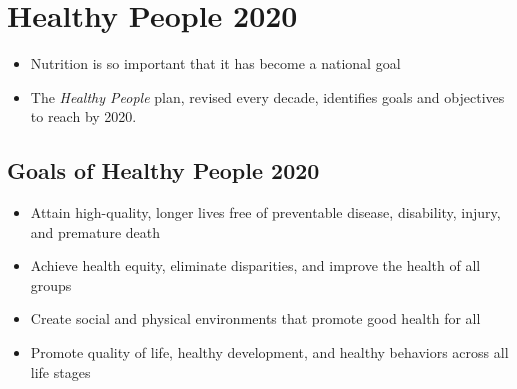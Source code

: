 \documentclass[title={Chapter 1}]{fdsn201notes}
\begin{document}
\section{Healthy People 2020}\label{sec:healthy-people-2020}
\begin{itemize}
	\item Nutrition is so important that it has become a national goal
	\item The \emph{Healthy People} plan, revised every decade, identifies goals and objectives to reach by 2020.
\end{itemize}

\subsection{Goals of Healthy People 2020}\label{subsec:goals-of-healthy-people-2020}
\begin{itemize}
	\item Attain high-quality, longer lives free of preventable disease, disability, injury, and premature death
	\item Achieve health equity, eliminate disparities, and improve the health of all groups
	\item Create social and physical environments that promote good health for all
	\item Promote quality of life, healthy development, and healthy behaviors across all life stages
\end{itemize}
\end{document}
